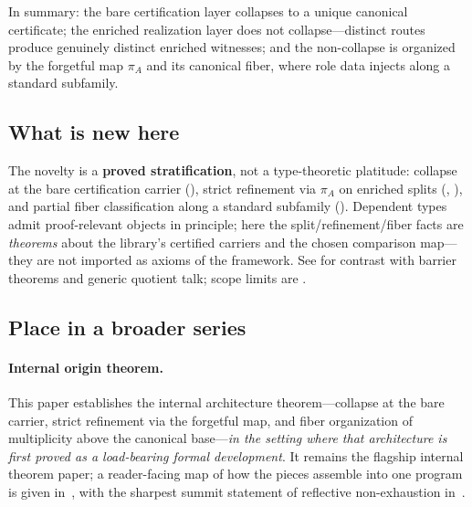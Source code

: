 \documentclass[11pt]{article}
\begin{document}
\noindent
In summary: the bare certification layer collapses to a unique canonical certificate; the enriched realization layer does not collapse---distinct routes produce genuinely distinct enriched witnesses; and the non-collapse is organized by the forgetful map $\pi_A$ and its canonical fiber, where role data injects along a standard subfamily.

\subsection{What is new here}\label{sec:intro-new}
The novelty is a \textbf{proved stratification}, not a type-theoretic platitude: collapse at the bare certification carrier (), strict refinement via $\pi_A$ on enriched splits (, ), and partial fiber classification along a standard subfamily (). Dependent types admit proof-relevant objects in principle; here the split/refinement/fiber facts are \emph{theorems} about the library's certified carriers and the chosen comparison map---they are not imported as axioms of the framework. See  for contrast with barrier theorems and generic quotient talk; scope limits are .

\subsection{Place in a broader series}\label{sec:intro-series}
\paragraph{Internal origin theorem.}
This paper establishes the internal architecture theorem---collapse at the bare carrier, strict refinement via the forgetful map, and fiber organization of multiplicity above the canonical base---\emph{in the setting where that architecture is first proved as a load-bearing formal development}. It remains the flagship internal theorem paper; a reader-facing map of how the pieces assemble into one program is given in~\cite{SpivackSynthesis}, with the sharpest summit statement of reflective non-exhaustion in~\cite{SpivackSummit}.
\end{document}
